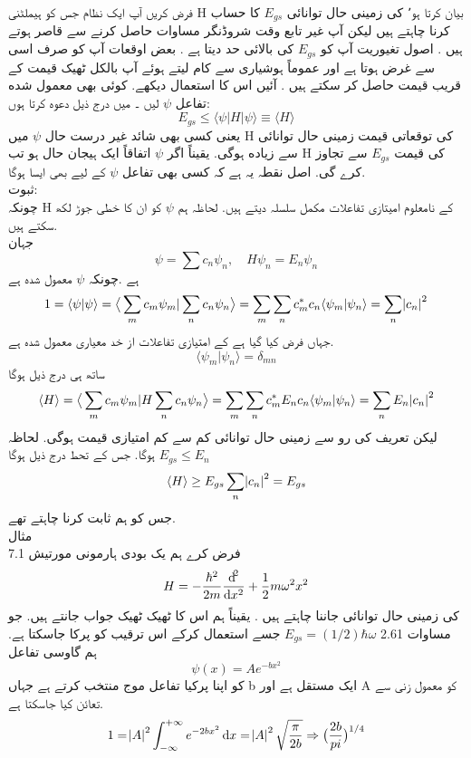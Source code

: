 
فرض کریں آپ ایک نظام جس کو ہیملٹنی H بیان کرتا ہو٬ کی زمینی حال توانائی
 \(E_{gs}\)
  کا حساب کرنا چاہتے ہیں لیکن آپ غير تابع وقت شروڈنگر مساوات حاصل کرنے سے قاصر ہوتے ہیں . اصول تغيوریت آپ کو 
 \(E_{gs}\)
  کی بالائی حد دیتا ہے . بعض اوقعات آپ کو صرف اسی سے غرض ہوتا ہے اور عموماً ہوشیاری سے کام لیتے ہوئے آپ بالکل ٹھیک قیمت کے قريب قیمت حاصل کر سکتے ہیں . آئیں اس کا استعمال دیکھے. کوئی بھی معمول شده تفاعل 
\(\psi\)
  لیں ۔ میں درج ذيل دعوه کرتا ہوں:
\[E_{gs}\le \langle \psi |H|\psi\rangle \equiv \langle H \rangle\]
یعنی کسی بھی شائد غير درست حال 
\(\psi\)
 میں H کی توقعاتی قیمت زمینی حال توانائی سے زياده ہوگی. یقیناً اگر 
 \(\psi\) 
 اتفاقاً ایک ہیجان حال ہو تب H کی قیمت
 \(E_{gs}\) 
 سے تجاوز کرے گی. اصل نقطہ یہ ہے کہ کسی بھی تفاعل 
 \(\psi\)
 کے لیے بھی ایسا ہوگا.\\
ثبوت: \\
چونکہ H کے نامعلوم امیتازی تفاعلات مكمل سلسلہ دیتے ہیں. لحاظہ ہم 
\(\psi\) 
کو ان کا خطی جوڑ لکھ سکتے ہیں.\\
جہان
\[\psi=\sum c_{n}\psi_{n}, \quad H\psi_{n}=E_{n}\psi_{n}\] 
ہے .چونکہ 
\(\psi\) 
معمول شده ہے\\
\[1=\langle \psi |\psi\rangle=\big\langle \sum_{m} c_{m}\psi_{m}|\sum_{n}c_{n}\psi_{n}\big\rangle=\sum_{m}\sum_{n}c_{m}^{*}c_{n}\langle \psi_{m}|\psi_{n}\rangle=\sum_{n}\abs{c_{n}}^{2}\]
جہاں فرض کیا گیا ہے کے امتیازی تفاعلات از خد معیاری معمول شدہ ہے.
\[\langle \psi_{m}|\psi_{n}\rangle=\delta_{mn}\]
ساتھ ہی درج ذیل ہوگا
\[\langle H \rangle=\big\langle \sum_{m} c_{m}\psi_{m}|H\sum_{n}c_{n}\psi_{n}\big\rangle=\sum_{m}\sum_{n}c_{m}^{*}E_{n}c_{n}\langle \psi_{m}|\psi_{n}\rangle=\sum_{n}E_{n}\abs{c_{n}}^{2}\]
ليكن تعريف کی رو سے زمینی حال توانائی کم سے کم امتیازی قیمت ہوگی. لحاظہ
\(E_{gs}\le E_{n}\)
ہوگا. جس کے تحط درج ذیل ہوگا
\[\langle H \rangle \ge E_{gs}\sum_{n}\abs{c_{n}}^{2}=E_{gs}\]
جس کو ہم ثابت کرنا چاہتے تھے.\\
مثال \\7.1
فرض كرے ہم یک بودی ہارمونی مورتیش
\[H=-\frac{\hbar^{2}}{2m}\frac{\dif^{2}}{\dif{x^{2}}}+\frac{1}{2}m\omega^{2}x^{2}\]
کی زمینی حال توانائی جاننا چاہتے ہیں . یقیناً ہم اس کا ٹھیک ٹھیک جواب جانتے ہیں. جو مساوات 2.61
\(E_{gs}=(1/2)\hbar\omega\)
جسے استعمال کرکے اس ترقيب کو پرکا جاسکتا ہے. ہم گاوسی تفاعل
 \[\psi(x)=Ae^{-bx^{2}}\] 
کو اپنا پرکیا تفاعل موج منتخب کرتے ہے جہاں b ایک مستقل ہے اور A کو معمول زنی سے تعائن کیا جاسکتا ہے.
\[1=\abs{A}^{2}\int_{-\infty}^{+\infty}e^{-2bx^{2}}\dif{x}=\abs{A}^{2}\sqrt{\frac{\pi}{2b}}\Rightarrow \big (\frac{2b}{pi}\big )^{1/4}\]
